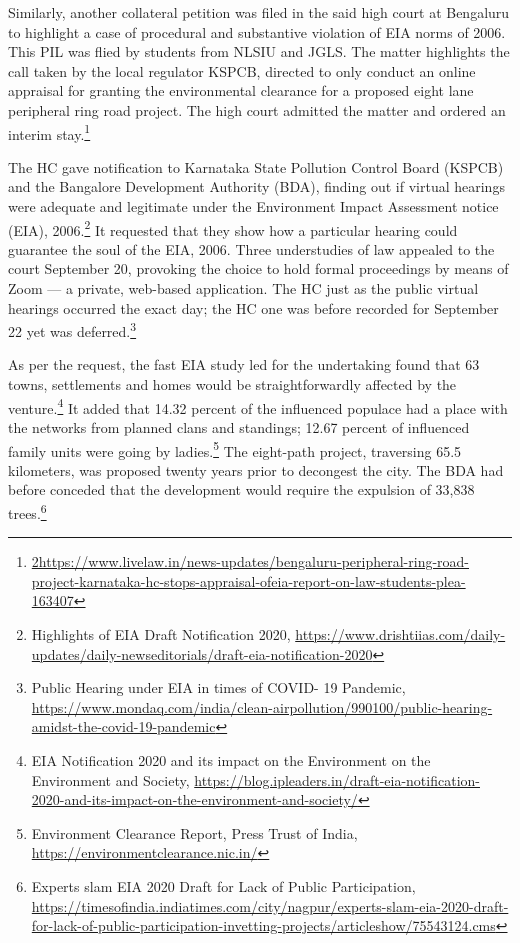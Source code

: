 \begin{multicols}{2}
\noi
Similarly, another collateral petition was filed in the said high court at Bengaluru to highlight
a case of procedural and substantive violation of EIA norms of 2006. This PIL was flied by
students from NLSIU and JGLS. The matter highlights the call taken by the local regulator
KSPCB, directed to only conduct an online appraisal for granting the environmental
clearance for a proposed eight lane peripheral ring road project. The high court admitted the
matter and ordered an interim stay.\footnote{\url{2https://www.livelaw.in/news-updates/bengaluru-peripheral-ring-road-project-karnataka-hc-stops-appraisal-ofeia-report-on-law-students-plea-163407}}

\vspace{-.1cm}

\noi
The HC gave notification to Karnataka State Pollution Control Board (KSPCB) and the
Bangalore Development Authority (BDA), finding out if virtual hearings were adequate and
legitimate under the Environment Impact Assessment notice (EIA), 2006.\footnote{Highlights of EIA Draft Notification 2020, \url{https://www.drishtiias.com/daily-updates/daily-newseditorials/draft-eia-notification-2020}} It requested that
they show how a particular hearing could guarantee the soul of the EIA, 2006. Three
understudies of law appealed to the court September 20, provoking the choice to hold formal
proceedings by means of Zoom — a private, web-based application. The HC just as the
public virtual hearings occurred the exact day; the HC one was before recorded for
September 22 yet was deferred.\footnote{Public Hearing under EIA in times of COVID- 19 Pandemic, \url{https://www.mondaq.com/india/clean-airpollution/990100/public-hearing-amidst-the-covid-19-pandemic}}

\vspace{-.2cm}

\noi
As per the request, the fast EIA study led for the undertaking found that 63 towns, settlements
and homes would be straightforwardly affected by the venture.\footnote{EIA Notification 2020 and its impact on the Environment on the Environment and Society,
\url{https://blog.ipleaders.in/draft-eia-notification-2020-and-its-impact-on-the-environment-and-society/}} It added that 14.32 percent
of the influenced populace had a place with the networks from planned clans and standings;
12.67 percent of influenced family units were going by ladies.\footnote{Environment Clearance Report, Press Trust of India, \url{https://environmentclearance.nic.in/}} The eight-path project,
traversing 65.5 kilometers, was proposed twenty years prior to decongest the city. The BDA
had before conceded that the development would require the expulsion of 33,838 trees.\footnote{Experts slam EIA 2020 Draft for Lack of Public Participation,
\url{https://timesofindia.indiatimes.com/city/nagpur/experts-slam-eia-2020-draft-for-lack-of-public-participation-invetting-projects/articleshow/75543124.cms}}



\end{multicols}
